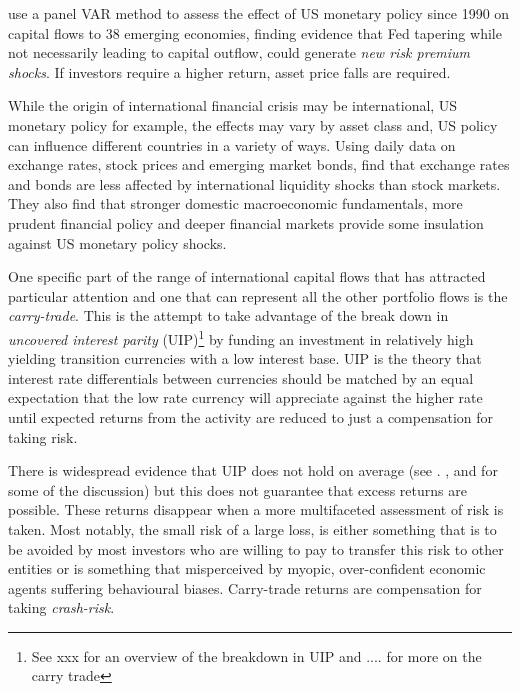 \documentclass[12pt, a4paper, oneside]{article} %
\begin{document}
\citet{IMFLatam} use a panel VAR method to assess the effect of US monetary policy since 1990 on capital flows to 38 emerging economies, finding evidence that Fed tapering while not necessarily leading to capital outflow, could generate \emph{new risk premium shocks}.   If investors require a higher return, asset price falls are required. 

While the origin of international financial crisis may be international, US monetary policy for example, the effects may vary by asset class and, US policy can influence different countries in a variety of ways.  Using daily data on exchange rates, stock prices and emerging market bonds, \citet{Tapering} find that exchange rates and bonds are less affected by international liquidity shocks than stock markets.  They also find that stronger domestic macroeconomic fundamentals, more prudent financial policy and deeper financial markets provide some insulation against US monetary policy shocks.

One specific part of the range of international capital flows that has attracted particular attention and one  that can represent all the other portfolio flows is the \emph{carry-trade}.  This is the attempt to take advantage of the break down in \emph{uncovered interest parity} (UIP)\footnote{See xxx for an overview of the breakdown in UIP and .... for more on the carry trade} by funding an investment in relatively high yielding transition currencies with a low interest base.  UIP is the theory that interest rate differentials between currencies should be matched by an equal expectation that the low rate currency will appreciate against the higher rate until expected returns from the activity are reduced to just a compensation for taking risk. %

There is widespread evidence that UIP does not hold on average (see \citet{FrootAnomolies}. \citet{FrootFrankelFDB}, \citet{Hodrick1987} and \citet{SpronkEER} for some of the discussion) but this does not guarantee that excess returns are possible.  These returns disappear when a more multifaceted assessment of risk is taken.  Most notably, the small risk of a large loss, is either something that is to be avoided by most investors who are willing to pay to transfer this risk to other entities or is something that misperceived by myopic, over-confident economic agents suffering behavioural biases. Carry-trade returns are compensation for taking \emph{crash-risk}.  
\end{document}
